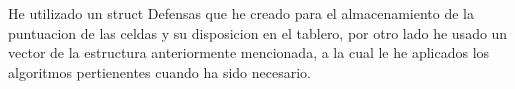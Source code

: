 He utilizado un struct Defensas que he creado para el almacenamiento de la puntuacion de las celdas y su disposicion en el tablero, por otro lado he usado un vector de la estructura anteriormente mencionada, a la cual le he aplicados los algoritmos pertienentes cuando ha sido necesario.
